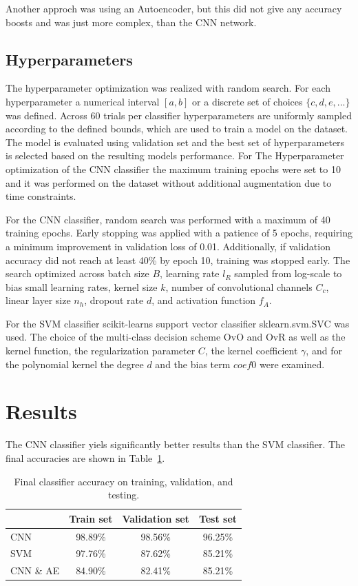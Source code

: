 \documentclass[a4, 10 pt, conference]{ieeeconf}  %
\begin{document}
Another approch was using an Autoencoder, but this did not give any accuracy boosts and was just more complex, than the CNN network.

\subsection{Hyperparameters}
\label{subsec:hyperparameters}

The hyperparameter optimization was realized with random search. For each
hyperparameter a numerical interval $[a, b]$ or a discrete set of choices $\{c,d,e,...\}$
was defined. Across 60 trials per classifier hyperparameters are uniformly sampled according
to the defined bounds, which are used to train a model on the dataset. The model is
evaluated using validation set and the best set of hyperparameters is selected
based on the resulting models performance.
For The Hyperparameter optimization of the CNN classifier the maximum training epochs
were set to 10 and it was performed on the dataset without additional augmentation due
to time constraints.

For the CNN classifier, random search was performed with a maximum of 40 training epochs.
Early stopping was applied with a patience of 5 epochs, requiring a minimum improvement in
validation loss of 0.01. Additionally, if validation accuracy did not reach at least 40\% by
epoch 10, training was stopped early. The search optimized across batch size $B$, learning rate
$l_R$ sampled from log-scale to bias small learning rates, kernel size $k$, number of convolutional channels $C_c$, linear layer size $n_h$, dropout
rate $d$, and activation function $f_A$.

For the SVM classifier scikit-learns support vector classifier sklearn.svm.SVC was used.
The choice of the multi-class decision scheme OvO and OvR as well as the kernel function,
the regularization parameter $C$, the kernel coefficient $\gamma$, and for the
polynomial kernel the degree $d$ and the bias term $coef0$ were examined.

\section{Results}
\label{sec:results}

The CNN classifier yiels significantly better results than the SVM classifier.
The final accuracies are shown in Table~\ref{tab:classifier_accuracy}.


\begin{table}[H]
  \centering
  \begin{tabular}{|l|c|c|c|}
    \hline
              & Train set & Validation set & Test set \\
    \hline
    CNN       & 98.89\%   & 98.56\%        & 96.25\%  \\
    SVM       & 97.76\%   & 87.62\%        & 85.21\%  \\
    CNN \& AE & 84.90\%   & 82.41\%        & 85.21\%  \\
    \hline
  \end{tabular}
  \caption{Final classifier accuracy on training, validation, and testing.}
  \label{tab:classifier_accuracy}
\end{table}
\end{document}
